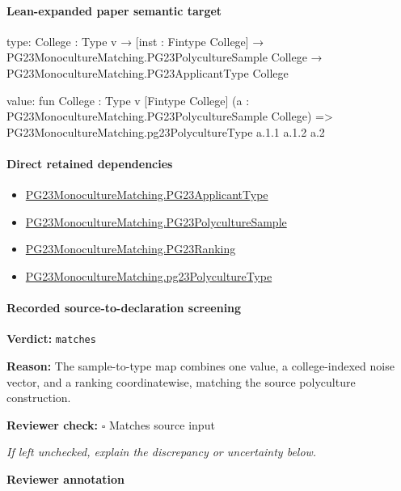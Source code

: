 \documentclass[10pt]{article}
\newcommand{\reviewerbox}{%
  \par\noindent\fbox{\parbox{0.96\linewidth}{\rule{0pt}{0.38in}}}\par
}
\newcommand{\reviewmatch}[1]{%
  \par\noindent\textbf{Reviewer check:} $\square$\; #1\par
  \noindent\emph{If left unchecked, explain the discrepancy or uncertainty below.}\par
}
\begin{document}
\paragraph{Lean-expanded paper semantic target}
\begin{ReviewVerbatim}
type:
{College : Type v} →
  [inst : Fintype College] →
    PG23MonocultureMatching.PG23PolycultureSample College → PG23MonocultureMatching.PG23ApplicantType College

value:
fun {College : Type v} [Fintype College] (a : PG23MonocultureMatching.PG23PolycultureSample College) =>
  PG23MonocultureMatching.pg23PolycultureType a.1.1 a.1.2 a.2
\end{ReviewVerbatim}

\paragraph{Direct retained dependencies}
\begin{itemize}\raggedright
\item \hyperlink{paper-prerequisite-40ad59c353cf95ec}{PG23\allowbreak{}Monoculture\allowbreak{}Matching.\allowbreak{}PG23\allowbreak{}Applicant\allowbreak{}Type}
\item \hyperlink{governing-declaration-e5eebf52b1fe50d0}{PG23\allowbreak{}Monoculture\allowbreak{}Matching.\allowbreak{}PG23\allowbreak{}Polyculture\allowbreak{}Sample}
\item \hyperlink{paper-prerequisite-8769258a80216d15}{PG23\allowbreak{}Monoculture\allowbreak{}Matching.\allowbreak{}PG23\allowbreak{}Ranking}
\item \hyperlink{paper-prerequisite-1b5614740ce1beb4}{PG23\allowbreak{}Monoculture\allowbreak{}Matching.\allowbreak{}pg23\allowbreak{}Polyculture\allowbreak{}Type}
\end{itemize}
\paragraph{Recorded source-to-declaration screening}
\textbf{Verdict:} \texttt{matches}
\\
{\raggedright
\textbf{Reason:} The sample-\allowbreak{}to-\allowbreak{}type map combines one value, a college-\allowbreak{}indexed noise vector, and a ranking coordinatewise, matching the source polyculture construction.\allowbreak{}
\par}
\reviewmatch{Matches source input}
\noindent\textbf{Reviewer annotation}\par
\reviewerbox
\clearpage
\hypertarget{paper-prerequisite-57a6e28ae64a74da}{}
\end{document}
